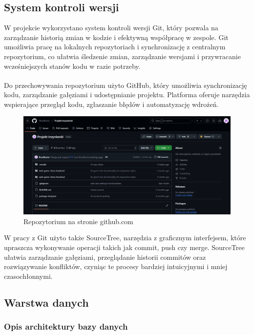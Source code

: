 \documentclass[twoside]{projektInzynierskiMS1}
\begin{document}
\subsection{System kontroli wersji}

\noindent
W projekcie wykorzystano system kontroli wersji Git, który pozwala na zarządzanie historią zmian w kodzie i efektywną współpracę w zespole. Git umożliwia pracę na lokalnych repozytoriach i synchronizację z centralnym repozytorium, co ułatwia śledzenie zmian, zarządzanie wersjami i przywracanie wcześniejszych stanów kodu w razie potrzeby.
\\\\
Do przechowywania repozytorium użyto GitHub, który umożliwia synchronizację kodu, zarządzanie gałęziami i udostępnianie projektu. Platforma oferuje narzędzia wspierające przegląd kodu, zgłaszanie błędów i automatyzację wdrożeń.

\vspace{0.5cm}
\begin{figure}[h!]
\centering
\includegraphics[width=1\textwidth]{images/gh_repo.png}
\caption{Repozytorium na stronie github.com}
\end{figure}
\vspace{0.5cm}

\noindent
W pracy z Git użyto także SourceTree, narzędzia z graficznym interfejsem, które upraszcza wykonywanie operacji takich jak commit, push czy merge. SourceTree ułatwia zarządzanie gałęziami, przeglądanie historii commitów oraz rozwiązywanie konfliktów, czyniąc te procesy bardziej intuicyjnymi i mniej czasochłonnymi.

\newpage

\subsection{Warstwa danych}

\subsubsection{Opis architektury bazy danych}
\end{document}
